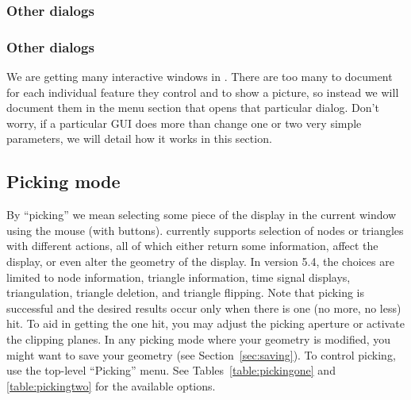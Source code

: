 \subsubsection{Other dialogs}

\subsubsection{Other dialogs}

We are getting many interactive windows in \map{}.  There are too many to
document for each individual feature they control and to show a picture,
so instead we will document them in the menu section that opens that 
particular dialog.  Don't worry, if a particular GUI does more than change
one or two very simple parameters, we will detail how it works in this section.

\subsection{Picking mode}
\label{sec:control-picking} 

By ``picking'' we mean selecting some piece of the display in the current
window using the mouse (with buttons).  \map{} currently supports selection
of nodes or triangles with different actions, all of which either return
some information, affect the display, or even alter the geometry of the
display.  In version 5.4, the choices are limited to node information,
triangle information, time signal displays, triangulation, triangle
deletion, and triangle flipping.  Note that picking is successful and the
desired results occur only when there is one (no more, no less) hit.  To
aid in getting the one hit, you may adjust the picking aperture or activate
the clipping planes.  In any picking mode where your geometry is modified,
you might want to save your geometry (see Section~\ref{sec:saving}).  To
control picking, use the top-level ``Picking'' menu. See
Tables~\ref{table:pickingone} and \ref{table:pickingtwo} for the available
options.




